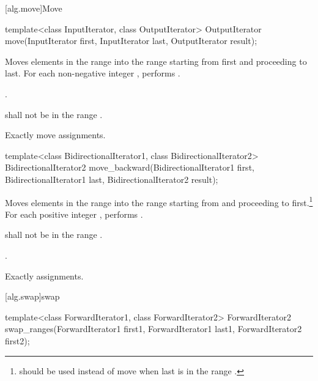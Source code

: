 [alg.move]{Move}

%
\begin{itemdecl}
template<class InputIterator, class OutputIterator>
  OutputIterator move(InputIterator first, InputIterator last,
                      OutputIterator result);
\end{itemdecl}


\begin{itemdescr}
\pnum
\effects
Moves elements in the range 
into the range 
starting from first and proceeding to last.
For each non-negative integer
,
performs
 .

\pnum
\returns
{}.

\pnum
\requires
{}
shall not be in the range
.

\pnum
\complexity
Exactly
move assignments.
\end{itemdescr}

%
\begin{itemdecl}
template<class BidirectionalIterator1, class BidirectionalIterator2>
  BidirectionalIterator2
    move_backward(BidirectionalIterator1 first,
                  BidirectionalIterator1 last,
                  BidirectionalIterator2 result);
\end{itemdecl}


\begin{itemdescr}
\pnum
\effects
Moves elements in the range 
into the
range 
starting from
and proceeding to first.\footnote{
should be used instead of move when last
is in
the range
.}
For each positive integer
,
performs
.

\pnum
\requires
{}
shall not be in the range
.

\pnum
\returns
{}.

\pnum
\complexity
Exactly
assignments.
\end{itemdescr}

[alg.swap]{swap}

%
\begin{itemdecl}
template<class ForwardIterator1, class ForwardIterator2>
  ForwardIterator2
    swap_ranges(ForwardIterator1 first1, ForwardIterator1 last1,
                ForwardIterator2 first2);
\end{itemdecl}


